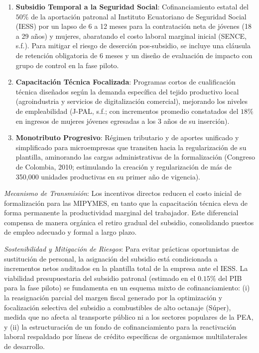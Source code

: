 \documentclass[10pt,]{article}
\providecommand{\tightlist}{%
  \setlength{\itemsep}{0pt}\setlength{\parskip}{0pt}}
\begin{document}
\begin{enumerate}
\def\labelenumi{\arabic{enumi}.}
\tightlist
\item
  \textbf{Subsidio Temporal a la Seguridad Social}: Cofinanciamiento
  estatal del \(50\%\) de la aportación patronal al Instituto
  Ecuatoriano de Seguridad Social (IESS) por un lapso de 6 a 12 meses
  para la contratación neta de jóvenes (18 a 29 años) y mujeres,
  abaratando el costo laboral marginal inicial (SENCE, s.f.). Para
  mitigar el riesgo de deserción pos-subsidio, se incluye una cláusula
  de retención obligatoria de 6 meses y un diseño de evaluación de
  impacto con grupo de control en la fase piloto.
\item
  \textbf{Capacitación Técnica Focalizada}: Programas cortos de
  cualificación técnica diseñados según la demanda específica del tejido
  productivo local (agroindustria y servicios de digitalización
  comercial), mejorando los niveles de empleabilidad (J-PAL, s.f.; con
  incrementos promedio constatados del \(18\%\) en ingresos de mujeres
  jóvenes egresadas a los 3 años de su inserción).
\item
  \textbf{Monotributo Progresivo}: Régimen tributario y de aportes
  unificado y simplificado para microempresas que transiten hacia la
  regularización de su plantilla, aminorando las cargas administrativas
  de la formalización (Congreso de Colombia, 2010; estimulando la
  creación y regularización de más de 350,000 unidades productivas en su
  primer año de vigencia).
\end{enumerate}

\emph{Mecanismo de Transmisión}: Los incentivos directos reducen el
costo inicial de formalización para las MIPYMES, en tanto que la
capacitación técnica eleva de forma permanente la productividad marginal
del trabajador. Este diferencial compensa de manera orgánica el retiro
gradual del subsidio, consolidando puestos de empleo adecuado y formal a
largo plazo.

\emph{Sostenibilidad y Mitigación de Riesgos}: Para evitar prácticas
oportunistas de sustitución de personal, la asignación del subsidio está
condicionada a incrementos netos auditados en la plantilla total de la
empresa ante el IESS. La viabilidad presupuestaria del subsidio patronal
(estimado en el \(0.15\%\) del PIB para la fase piloto) se fundamenta en
un esquema mixto de cofinanciamiento: (i) la reasignación parcial del
margen fiscal generado por la optimización y focalización selectiva del
subsidio a combustibles de alto octanaje (Súper), medida que no afecta
al transporte público ni a los sectores populares de la PEA, y (ii) la
estructuración de un fondo de cofinanciamiento para la reactivación
laboral respaldado por líneas de crédito específicas de organismos
multilaterales de desarrollo.
\end{document}
